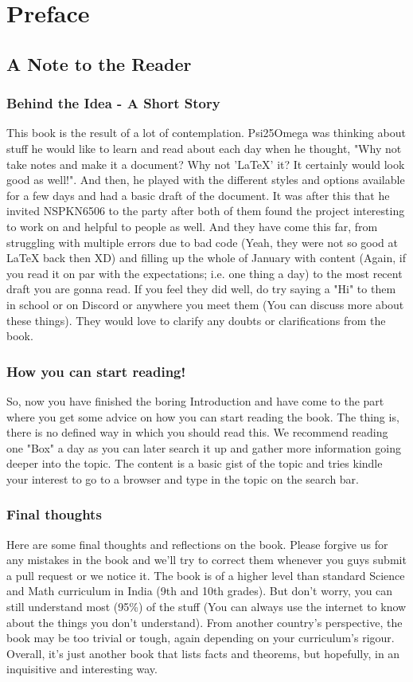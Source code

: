 \section{Preface}
\subsection{A Note to the Reader}
\subsubsection{Behind the Idea - A Short Story}
This book is the result of a lot of contemplation. Psi25Omega was thinking about stuff he would like to learn and read about each day when he thought, "Why not take notes and make it a document? Why not 'LaTeX' it? It certainly would look good as well!". And then, he played with the different styles and options available for a few days and had a basic draft of the document. It was after this that he invited NSPKN6506 to the party after both of them found the project interesting to work on and helpful to people as well. And they have come this far, from struggling with multiple errors due to bad code (Yeah, they were not so good at LaTeX back then XD) and filling up the whole of January with content (Again, if you read it on par with the expectations; i.e. one thing a day) to the most recent draft you are gonna read. If you feel they did well, do try saying a "Hi" to them in school or on Discord or anywhere you meet them (You can discuss more about these things). They would love to clarify any doubts or clarifications from the book.
\subsubsection{How you can start reading!}
So, now you have finished the boring Introduction and have come to the part where you get some advice on how you can start reading the book. The thing is, there is no defined way in which you should read this. We recommend reading one "Box" a day as you can later search it up and gather more information going deeper into the topic. The content is a basic gist of the topic and tries kindle your interest to go to a browser and type in the topic on the search bar.
\subsubsection{Final thoughts}
Here are some final thoughts and reflections on the book. Please forgive us for any mistakes in the book and we'll try to correct them whenever you guys submit a pull request or we notice it. The book is of a higher level than standard Science and Math curriculum in India (9th and 10th grades). But don't worry, you can still understand most (95\%) of the stuff (You can always use the internet to know about the things you don't understand). From another country's perspective, the book may be too trivial or tough, again depending on your curriculum's rigour. Overall, it's just another book that lists facts and theorems, but hopefully, in an inquisitive and interesting way.
